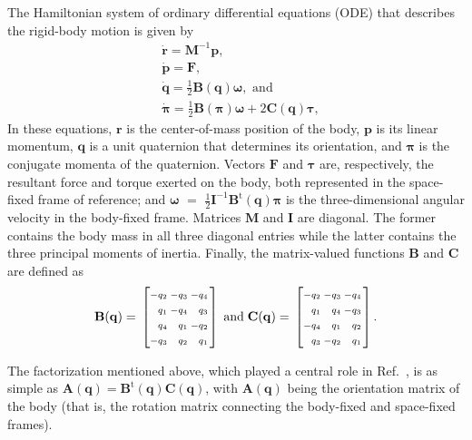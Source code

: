 \documentclass[
journal=jctcce,
layout=twocolumn
]{achemso}
\makeatletter
\newcommand{\mt}[1]{\boldsymbol{\mathbf{#1}}}   %
\newcommand{\vt}[1]{\boldsymbol{\mathbf{#1}}}   %
\newcommand{\tr}[1]{#1^\text{t}}                %
\newcommand{\diff}[2]{\frac{\partial #1}{\partial #2}} %
\newcommand{\Ham}[1]{{\mathcal H}_\text{#1}}    %
\newenvironment{smallarray}[1]                          %
{\null\,\vcenter\bgroup\scriptsize
	\renewcommand{\arraystretch}{1.5}
	\arraycolsep=.13885em
	\hbox\bgroup$\left[\array{@{}#1@{}}}
{\endarray\right]$\egroup\egroup\,\null}
\makeatother
\begin{document}
The Hamiltonian system of ordinary differential equations (ODE) that describes the rigid-body motion is given by \cite{Silveira_2017}
\begin{subequations}
	\label{eq:ODE system for NVE}
	\begin{align}
%
	&\dot{\vt r} =
	{\mt M}^{-1} {\vt p}, \\
%
	&\dot{\vt p} =
	{\vt F}, \\
%
	&\dot{\vt q} =
	\frac{1}{2} \mt B(\vt q) \vt \omega, \text{ and} \label{eq:EDO_q} \\
%
	&\dot{\vt \pi} =
	\frac{1}{2} \mt B(\vt \pi) \vt \omega + 2 \mt C(\vt q) \vt \tau, \label{eq:EDO_pi}
	\end{align}
\end{subequations}
In these equations, $\vt r$ is the center-of-mass position of the body, $\vt p$ is its linear momentum, $\vt q$ is a unit quaternion that determines its orientation, and $\vt \pi$ is the conjugate momenta of the quaternion.
Vectors $\vt F$ and $\vt \tau$ are, respectively, the resultant force and torque exerted on the body, both represented in the space-fixed frame of reference; and $\vt \omega$ $=$ $\frac{1}{2} {\mt I}^{-1} \tr{\mt B}(\vt q) {\vt \pi}$ is the three-dimensional angular velocity in the body-fixed frame.
Matrices $\mt M$ and $\mt I$ are diagonal.
The former contains the body mass in all three diagonal entries while the latter contains the three principal moments of inertia.
Finally, the matrix-valued functions $\mt B$ and $\vt C$ are defined as
\begin{equation*}
\label{eq:def_B_and_C}
\mt B(\vt q) = \begin{smallarray}{rrrr}
-q_2 & -q_3 & -q_4 \\
 q_1 & -q_4 &  q_3 \\
 q_4 &  q_1 & -q_2 \\
-q_3 &  q_2 &  q_1
\end{smallarray}
%
\; \text{and} \;
%
\mt C(\vt q) = \begin{smallarray}{rrrr}
-q_2 & -q_3 & -q_4 \\
 q_1 &  q_4 & -q_3 \\
-q_4 &  q_1 &  q_2 \\
 q_3 & -q_2 &  q_1
\end{smallarray}.
\end{equation*}

The factorization mentioned above, which played a central role in Ref.~, is as simple as ${\mt A}(\vt q) = \tr{\mt B}(\vt q) {\mt C}(\vt q)$, with ${\mt A}(\vt q)$ being the orientation matrix of the body (that is, the rotation matrix connecting the body-fixed and space-fixed frames).
\end{document}

